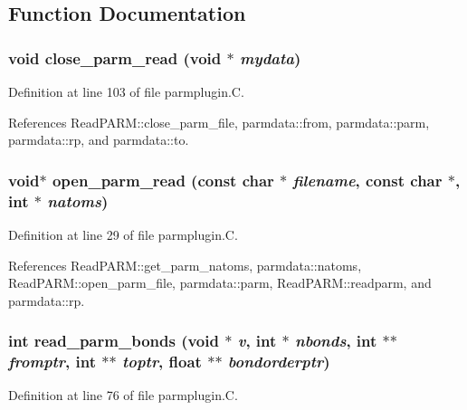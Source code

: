 \subsection{Function Documentation}
\subsubsection{\setlength{\rightskip}{0pt plus 5cm}void close\_\-parm\_\-read (void $\ast$ {\em mydata})\hspace{0.3cm}{\tt  [static]}}\label{parmplugin_8C_a4}




Definition at line 103 of file parmplugin.C.

References Read\-PARM::close\_\-parm\_\-file, parmdata::from, parmdata::parm, parmdata::rp, and parmdata::to.
\subsubsection{\setlength{\rightskip}{0pt plus 5cm}void$\ast$ open\_\-parm\_\-read (const char $\ast$ {\em filename}, const char $\ast$, int $\ast$ {\em natoms})\hspace{0.3cm}{\tt  [static]}}\label{parmplugin_8C_a1}




Definition at line 29 of file parmplugin.C.

References Read\-PARM::get\_\-parm\_\-natoms, parmdata::natoms, Read\-PARM::open\_\-parm\_\-file, parmdata::parm, Read\-PARM::readparm, and parmdata::rp.
\subsubsection{\setlength{\rightskip}{0pt plus 5cm}int read\_\-parm\_\-bonds (void $\ast$ {\em v}, int $\ast$ {\em nbonds}, int $\ast$$\ast$ {\em fromptr}, int $\ast$$\ast$ {\em toptr}, float $\ast$$\ast$ {\em bondorderptr})\hspace{0.3cm}{\tt  [static]}}\label{parmplugin_8C_a3}




Definition at line 76 of file parmplugin.C.

